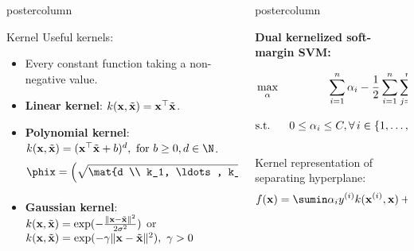\documentclass{beamer}
\newlength{\columnheight} %
\begin{document}
\begin{frame}[fragile]{}
\begin{columns}
\begin{column}{.31\textwidth}
\begin{beamercolorbox}[center]{postercolumn}
\begin{minipage}{.98\textwidth}
{\begin{myblock}{Kernel}
    Useful kernels:
  \begin{itemize}[$\bullet$]
    \setlength{\itemindent}{+.3in}
      \item Every constant function taking a non-negative value.
      \item \textbf{Linear kernel}: $k(\mathbf{x}, \tilde {\mathbf{x}}) = \mathbf{x}^\top \tilde {\mathbf{x}}$.
      \item \textbf{Polynomial kernel}: $k(\xv, \tilde \xv) = (\xv^\top \tilde \xv + b)^d, \text{ for } b\geq 0, d \in \N$.
      $$\phix = \left( \sqrt{\mat{d \\ k_1, \ldots, k_{p+1}}} x_1^{k_1} \ldots x_p^{k_p} b^{k_{p+1}/2} \right)_{k_i \geq 0, \sum_i k_i = d}$$
      \item \textbf{Gaussian kernel}: $k(\mathbf{x}, \tilde {\mathbf{x}}) = \exp(-\frac{\|\mathbf{x} - \tilde {\mathbf{x}}\|^2}{2\sigma^2})$
or $k(\mathbf{x}, \tilde {\mathbf{x}}) = \exp(-\gamma \|\mathbf{x} - \tilde {\mathbf{x}}\|^2), ~ \gamma>0$
    \end{itemize}


\end{myblock}
				}
			\end{minipage}
		\end{beamercolorbox}
	\end{column}
	

\begin{column}{.31\textwidth}
\begin{beamercolorbox}[center]{postercolumn}
\begin{minipage}{.98\textwidth}
\parbox[t][\columnheight]{\textwidth}{

\begin{myblock}{ }
\begin{codebox}
\textbf{Dual kernelized soft-margin SVM:}
\end{codebox}
									\begin{eqnarray*}
										& \max_{\alpha} & \sum_{i=1}^n \alpha_i - \frac{1}{2}\sum_{i=1}^n\sum_{j=1}^n\alpha_i\alpha_jy^{(i)} y^{(j)} k(\mathbf{x}^{(i)}, \mathbf{x}^{(j)})  \\
										& \text{s.t. } & 0 \le \alpha_i \le C, \forall\, i \in \{1, \ldots, n\} \quad \text{and} \quad  \sum_{i=1}^n \alpha_i y^{(i)} = 0
									\end{eqnarray*}	
							
								Kernel representation of separating hyperplane:
									$$ \fx = \sumin \alpha_i \yi k(\xi, \xv)  + \theta_0$$

\end{myblock}

}
\end{minipage}
\end{beamercolorbox}
\end{column}
\end{columns}
\end{frame}
\end{document}
